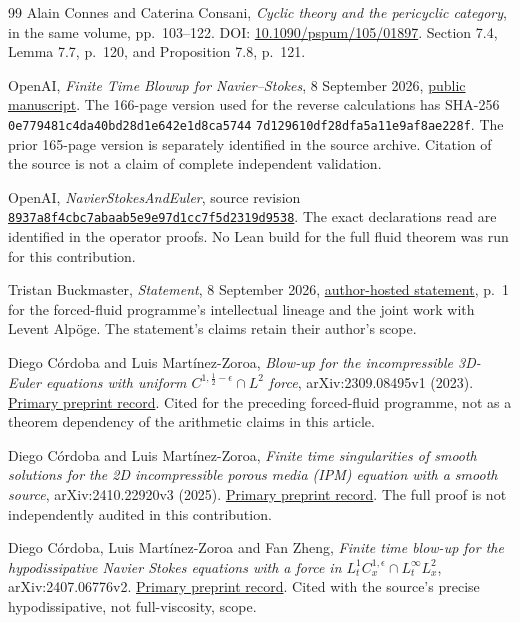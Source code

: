 \begin{thebibliography}{99}
Alain Connes and Caterina Consani,
\emph{Cyclic theory and the pericyclic category},
in the same volume, pp.~103--122.
DOI: \href{https://doi.org/10.1090/pspum/105/01897}{10.1090/pspum/105/01897}.
Section 7.4, Lemma 7.7, p.~120, and Proposition 7.8, p.~121.

OpenAI, \emph{Finite Time Blowup for Navier--Stokes}, 8 September 2026,
\href{https://cdn.openai.com/pdf/32d9f210-8b73-45e0-91bc-82a30aef8a9a/navier-stokes.pdf}
{public manuscript}. The 166-page version used for the reverse calculations
has SHA-256
\texttt{0e779481c4da40bd28d1e642e1d8ca5744}\allowbreak
\texttt{7d129610df28dfa5a11e9af8ae228f}.
The prior 165-page version is separately identified in the source archive.
Citation of the source is not a claim of complete independent validation.

OpenAI, \emph{NavierStokesAndEuler}, source revision
\href{https://github.com/openai/NavierStokesAndEuler/tree/8937a8f4cbc7abaab5e9e97d1cc7f5d2319d9538}
{\texttt{8937a8f4cbc7abaab5e9e97d1cc7f5d2319d9538}}.
The exact declarations read are identified in the operator proofs.
No Lean build for the full fluid theorem was run for this contribution.

Tristan Buckmaster, \emph{Statement}, 8 September 2026,
\href{https://cims.nyu.edu/~tristanb/statement.pdf}{author-hosted statement},
p.~1 for the forced-fluid programme's intellectual lineage and the joint
work with Levent Alp\"oge. The statement's claims retain their author's scope.

Diego C\'ordoba and Luis Mart\'inez-Zoroa,
\emph{Blow-up for the incompressible 3D-Euler equations with uniform
$C^{1,\frac12-\epsilon}\cap L^2$ force}, arXiv:2309.08495v1 (2023).
\href{https://arxiv.org/abs/2309.08495v1}{Primary preprint record}.
Cited for the preceding forced-fluid programme, not as a theorem dependency
of the arithmetic claims in this article.

Diego C\'ordoba and Luis Mart\'inez-Zoroa,
\emph{Finite time singularities of smooth solutions for the 2D incompressible
porous media (IPM) equation with a smooth source}, arXiv:2410.22920v3 (2025).
\href{https://arxiv.org/abs/2410.22920v3}{Primary preprint record}.
The full proof is not independently audited in this contribution.

Diego C\'ordoba, Luis Mart\'inez-Zoroa and Fan Zheng,
\emph{Finite time blow-up for the hypodissipative Navier Stokes equations
with a force in $L^1_t C_x^{1,\epsilon}\cap L^\infty_tL_x^2$},
arXiv:2407.06776v2.
\href{https://arxiv.org/abs/2407.06776v2}{Primary preprint record}.
Cited with the source's precise hypodissipative, not full-viscosity, scope.


\end{thebibliography}
